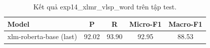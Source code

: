 \begin{table}[t]
\centering
\begin{tabular}{lcccc}
\hline
\textbf{Model} & \textbf{P} & \textbf{R} & \textbf{Micro-F1} & \textbf{Macro-F1} \\
\hline
xlm-roberta-base (last) & 92.02 & 93.90 & 92.95 & 88.53 \\
\hline
\end{tabular}
\caption{Kết quả exp14_xlmr_vlsp_word trên tập test.}
\label{tab:main}
\end{table}